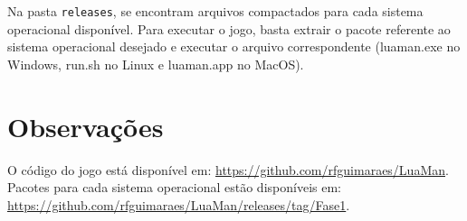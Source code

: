 \documentclass[a4paper]{scrartcl}
\begin{document}
Na pasta \texttt{releases}, se encontram arquivos compactados para cada sistema operacional disponível.
Para executar o jogo, basta extrair o pacote referente ao sistema operacional desejado e executar o
arquivo correspondente (luaman.exe no Windows, run.sh no Linux e luaman.app no MacOS).

\section{Observações}

O código do jogo está disponível em: \url{https://github.com/rfguimaraes/LuaMan}.
Pacotes para cada sistema operacional estão disponíveis em: \url{https://github.com/rfguimaraes/LuaMan/releases/tag/Fase1}.
\end{document}
